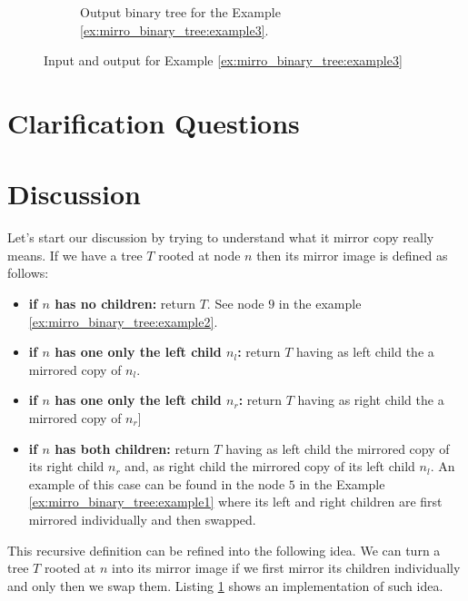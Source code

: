 \begin{figure}
\begin{subfigure}[b]{0.4\textwidth}
		\caption{Output binary tree for the Example \ref{ex:mirro_binary_tree:example3}.}
		\label{fig:mirro_binary_tree:example3_1}
	 \end{subfigure}
	 \caption[]{Input and output for Example \ref{ex:mirro_binary_tree:example3}}

\end{figure}




\section{Clarification Questions}


\begin{QandA}
	\item 
	\begin{answered}
		\textit{}
	\end{answered}
	
\end{QandA}

\section{Discussion}
\label{mirror_binary_tree:sec:discussion}
Let's start our discussion by trying to understand what it mirror copy really means. 
If we have a tree $T$ rooted at node $n$ then its mirror image  is defined as follows:
\begin{itemize}
	\item \textbf{if $n$ has no children:} return  $T$. See node $9$ in the example \ref{ex:mirro_binary_tree:example2}.
	\item \textbf{if $n$ has one only the left child $n_l$:}  return $T$ having as left child the a mirrored copy of $n_l$.
	\item \textbf{if $n$ has one only the left child $n_r$:}  return $T$ having as right child the a mirrored copy of $n_r$]
	\item \textbf{if $n$ has both children:} return $T$ having as left child the mirrored copy of its right child $n_r$ and,
	 as right child the mirrored copy of its left child $n_l$.  An example of this case can be found
	  in the node $5$ in the Example \ref{ex:mirro_binary_tree:example1}
	 where its left and right children are first mirrored individually and then swapped. 
\end{itemize}
This recursive definition can be refined into the following idea. We can turn a tree $T$ rooted at $n$ into its mirror image
if we first mirror its children individually and only then we swap them.
Listing \ref{} shows an implementation of such idea.


